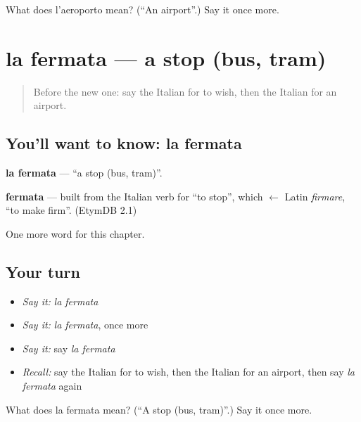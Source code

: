 \begin{tcolorbox}[breakable,colback=teal!4,colframe=teal!35!black,title={Before you move on}]
What does l'aeroporto mean? (\textquotedblleft{}An airport\textquotedblright{}.) Say it once more.
\end{tcolorbox}
\section[la fermata]{la fermata — a stop (bus, tram)}

\label{lesson:IT-C87-fermata}



\begin{quote}
Before the new one: say the Italian for to wish, then the Italian for an airport.
\end{quote}

\subsection*{You'll want to know: la fermata}
\textbf{la fermata} — \textquotedblleft{}a stop (bus, tram)\textquotedblright{}.

\begin{cousinweb}
\textbf{fermata} — built from the Italian verb for \textquotedblleft{}to stop\textquotedblright{}, which $\leftarrow$ Latin \emph{firmare}, \textquotedblleft{}to make firm\textquotedblright{}. (EtymDB 2.1)
\end{cousinweb}

\begin{grammarlens}[title={What you've built}]
One more word for this chapter.
\end{grammarlens}

\subsection*{Your turn}
\begin{itemize}
\raggedright
  \item \emph{Say it:} \emph{la fermata}
  \item \emph{Say it:} \emph{la fermata}, once more
  \item \emph{Say it:} say \emph{la fermata}
  \item \emph{Recall:} say the Italian for to wish, then the Italian for an airport, then say \emph{la fermata} again
\end{itemize}

\begin{tcolorbox}[breakable,colback=teal!4,colframe=teal!35!black,title={Before you move on}]
What does la fermata mean? (\textquotedblleft{}A stop (bus, tram)\textquotedblright{}.) Say it once more.
\end{tcolorbox}
